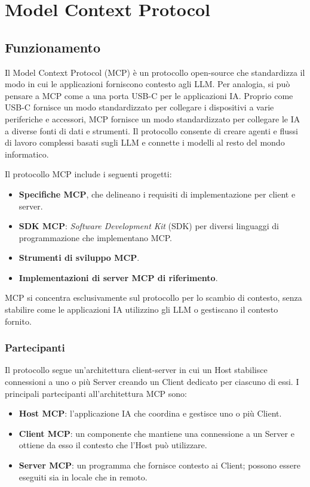 \chapter{Model Context Protocol}

\section{Funzionamento}
Il Model Context Protocol (MCP) è un protocollo open-source che standardizza il modo in cui le applicazioni forniscono contesto agli LLM. Per analogia, 
si può pensare a MCP come a una porta USB-C per le applicazioni IA. Proprio come USB-C fornisce un modo standardizzato per collegare i dispositivi 
a varie periferiche e accessori, MCP fornisce un modo standardizzato per collegare le IA a diverse fonti di dati e strumenti. Il protocollo 
consente di creare agenti e flussi di lavoro complessi basati sugli LLM e connette i modelli al resto del mondo informatico. 
\cite{modelcontextprotocol2024intro}

Il protocollo MCP include i seguenti progetti:
\begin{itemize}
\item \textbf{Specifiche MCP}, che delineano i requisiti di implementazione per client e server.
\item \textbf{SDK MCP}: \textit{Software Development Kit} (SDK) per diversi linguaggi di programmazione che implementano MCP.
\item \textbf{Strumenti di sviluppo MCP}.
\item \textbf{Implementazioni di server MCP di riferimento}.
\end{itemize}
MCP si concentra esclusivamente sul protocollo per lo scambio di contesto, senza stabilire come le applicazioni IA utilizzino gli LLM o gestiscano il contesto fornito.
\cite{modelcontextprotocol2024arch}

\subsection{Partecipanti}
Il protocollo segue un'architettura client-server in cui un Host stabilisce connessioni a uno o più Server creando un Client dedicato per ciascuno
di essi. I principali partecipanti all'architettura MCP sono:
\begin{itemize}
\item \textbf{Host MCP}: l'applicazione IA che coordina e gestisce uno o più Client.
\item \textbf{Client MCP}: un componente che mantiene una connessione a un Server e ottiene da esso il contesto che l'Host può utilizzare.
\item \textbf{Server MCP}: un programma che fornisce contesto ai Client; possono essere eseguiti sia in locale che in remoto.
\cite{modelcontextprotocol2024arch}
\end{itemize}

